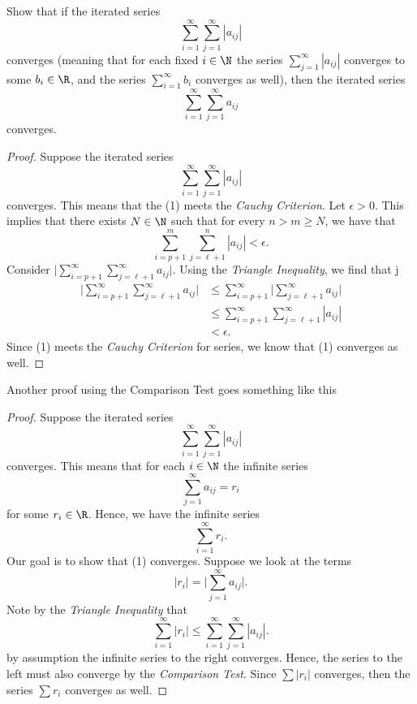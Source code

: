 Show that if the iterated series 
\[ \sum_{i=1}^{\infty} \sum_{j=1}^{\infty} |a_{ij}|\]
converges (meaning that for each fixed \( i \in \N \) the series \( \sum_{j=1}^{\infty} |a_{ij}|\) converges to some \( b_i \in \R \), and the series \( \sum_{i=1}^{\infty} b_i \) converges as well), then the iterated series 
\[ \sum_{i=1}^{\infty} \sum_{j=1}^{\infty} a_{ij}\]
converges.

\begin{proof}
Suppose the iterated series 
\[ \sum_{i=1}^{\infty} \sum_{j=1}^{\infty} |a_{ij}|  \tag{1}\]
converges. This means that the (1) meets the \textit{Cauchy Criterion}. Let \(\epsilon > 0 \). This implies that there exists \( N \in \N \) such that for every \( n > m  \geq N \), we have that 
\[ \sum_{i= p + 1}^{m} \sum_{j= \ell + 1}^{n} |a_{ij}| < \epsilon.\]
Consider \( \Big| \sum_{i=p+1}^{\infty} \sum_{j = \ell + 1 }^{\infty} a_{ij} \Big|\). Using the \textit{Triangle Inequality}, we find that  
j\begin{align*}
    \Big| \sum_{i=p+1}^{\infty} \sum_{j = \ell + 1 }^{\infty} a_{ij} \Big|&\leq \sum_{i=p+1}^{\infty} \Big|\sum_{ j = \ell + 1 }^{\infty} a_{ij} \Big|   \\
                                                                          &\leq \sum_{i = p + 1}^{\infty} \sum_{j = \ell + 1 }^{\infty} |a_{ij}| \\
                                                                          &< \epsilon.
\end{align*}
Since (1) meets the \textit{Cauchy Criterion} for series, we know that (1) converges as well. 
\end{proof}

Another proof using the Comparison Test goes something like this

\begin{proof}
    Suppose the iterated series 
    \[ \sum_{i=1}^{\infty} \sum_{j=1}^{\infty} |a_{ij}| \]
    converges. This means that for each \( i \in \N \) the infinite series 
    \[ \sum_{j=1}^{\infty} a_{ij} = r_i \] for some \( r_i \in \R \). Hence, we have the infinite series 
    \[ \sum_{i=1}^{\infty} r_i. \tag{1} \]
    Our goal is to show that (1) converges. Suppose we look at the terms 
    \[ |r_i| = \Big| \sum_{j=1}^{\infty} a_{ij}\Big|.\]
    Note by the \textit{Triangle Inequality} that 
    \[ \sum_{i=1}^{\infty} |r_i| \leq \sum_{i=1}^{\infty} \sum_{j=1}^{\infty} |a_{ij}|.  \]
    by assumption the infinite series to the right converges. Hence, the series to the left must also converge by the \textit{Comparison Test}. Since \( \sum |r_i|\) converges, then the series 
    \( \sum r_i \) converges as well. 
\end{proof}

